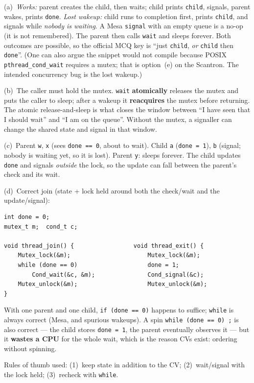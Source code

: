 \documentclass[11pt,a4paper]{article}
\newenvironment{Sol}{%
  \begin{tcolorbox}[sboxstyle, title={Solution}]%
}{%
  \end{tcolorbox}\vspace{0.35em}%
}
\begin{document}
\begin{Sol}
(a)~\emph{Works:} parent creates the child, then waits; child prints
\texttt{child}, signals, parent wakes, prints \texttt{done}.
\emph{Lost wakeup:} child runs to completion first, prints
\texttt{child}, and signals while \emph{nobody is waiting}. A Mesa
\texttt{signal} with an empty queue is a no-op (it is not remembered).
The parent then calls \texttt{wait} and sleeps forever. Both outcomes
are possible, so the official MCQ key is
``just \texttt{child}, \emph{or} \texttt{child} then \texttt{done}''.
(One can also argue the snippet would not compile because POSIX
\texttt{pthread\_cond\_wait} requires a mutex; that is option~(e) on
the Scantron. The intended concurrency bug is the lost wakeup.)

(b)~The caller must hold the mutex. \texttt{wait} \textbf{atomically}
releases the mutex and puts the caller to sleep; after a wakeup it
\textbf{reacquires} the mutex before returning. The atomic
release-and-sleep is what closes the window between ``I have seen that
I should wait'' and ``I am on the queue''. Without the mutex, a
signaller can change the shared state and signal in that window.

(c)~Parent \texttt{w}, \texttt{x} (sees \texttt{done == 0}, about to
wait). Child \texttt{a} (\texttt{done = 1}), \texttt{b} (signal; nobody
is waiting yet, so it is lost). Parent \texttt{y}: sleeps forever.
The child updates \texttt{done} and signals \emph{outside} the lock, so
the update can fall between the parent's check and its wait.

(d)~Correct join (state + lock held around both the check/wait and the
update/signal):
\begin{lstlisting}[numbers=none]
int done = 0;
mutex_t m;  cond_t c;

void thread_join() {                 void thread_exit() {
    Mutex_lock(&m);                      Mutex_lock(&m);
    while (done == 0)                    done = 1;
        Cond_wait(&c, &m);               Cond_signal(&c);
    Mutex_unlock(&m);                    Mutex_unlock(&m);
}
\end{lstlisting}
With one parent and one child, \texttt{if (done == 0)} happens to
suffice; \texttt{while} is always correct (Mesa, and spurious wakeups).
A spin \texttt{while (done == 0) ;} is also correct --- the child
stores \texttt{done = 1}, the parent eventually observes it --- but it
\textbf{wastes a CPU} for the whole wait, which is the reason CVs exist:
ordering without spinning.

Rules of thumb used: (1)~keep state in addition to the CV;
(2)~wait/signal with the lock held; (3)~recheck with \texttt{while}.
\end{Sol}
\end{document}
